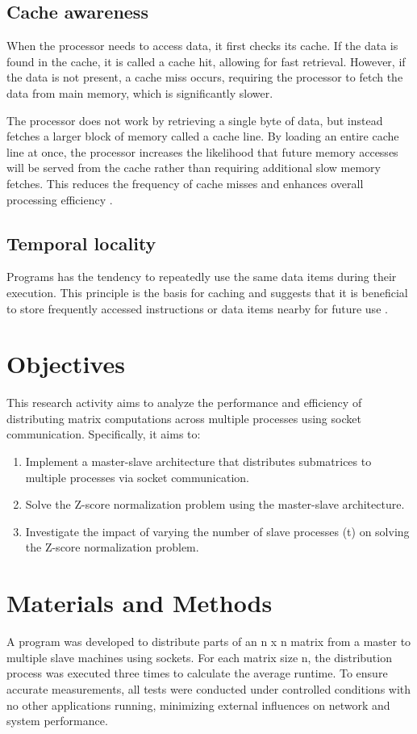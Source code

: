 \documentclass[journal]{./IEEE/IEEEtran}
\begin{document}
\subsection{Cache awareness}
When the processor needs to access data, it first checks its cache.
If the data is found in the cache, it is called a cache hit, allowing for fast retrieval.
However, if the data is not present, a cache miss occurs, requiring the processor to fetch the data from main memory, which is significantly slower.

The processor does not work by retrieving a single byte of data, but instead fetches a larger block of memory called a cache line.
By loading an entire cache line at once, the processor increases the likelihood that future memory accesses will be served from the cache rather than requiring additional slow memory fetches.
This reduces the frequency of cache misses and enhances overall processing efficiency \cite{newhehe}.

\subsection{Temporal locality}
Programs has the tendency to repeatedly use the same data items during their execution. This principle is the basis for caching and suggests that it is beneficial to store frequently accessed instructions or data items nearby for future use \cite{jacob2010memory}.


\section{Objectives}
    This research activity aims to analyze the performance and efficiency of distributing matrix computations across multiple processes using socket communication.
    Specifically, it aims to:
\begin{enumerate}
    \item Implement a master-slave architecture that distributes submatrices to multiple processes via socket communication.
    \item Solve the Z-score normalization problem using the master-slave architecture.
    \item Investigate the impact of varying the number of slave processes (t) on solving the Z-score normalization problem.
\end{enumerate}


\section{Materials and Methods}
A program was developed to distribute parts of an n x n matrix from a master to multiple slave machines using sockets. For each matrix size n, the distribution process was executed three times to calculate the average runtime. To ensure accurate measurements, all tests were conducted under controlled conditions with no other applications running, minimizing external influences on network and system performance.
\end{document}
